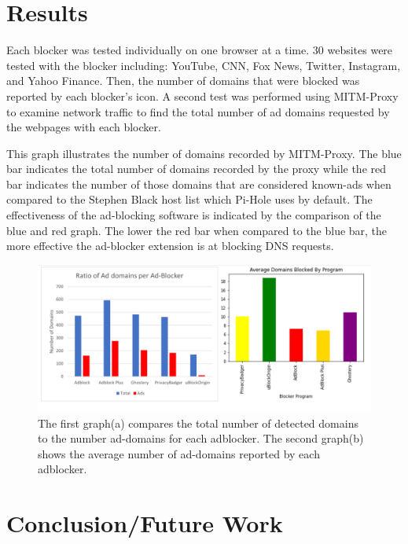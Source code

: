 \documentclass[sigsmall]{acmart}
\begin{document}
\section*{Results}
Each blocker was tested individually on one browser at a time. 30 websites were tested with the blocker including: YouTube, CNN, Fox News, Twitter, Instagram, and Yahoo Finance.
 Then, the number of domains that were blocked was reported by each blocker's icon.
 A second test was performed using MITM-Proxy to examine network traffic to find the total number of ad domains requested by the webpages with each blocker.

This graph illustrates the number of domains recorded by MITM-Proxy.
The blue bar indicates the total number of domains recorded by the proxy while the red bar indicates the number of those domains that are considered known-ads when compared to the Stephen Black host list which Pi-Hole uses by default.
The effectiveness of the ad-blocking software is indicated by the comparison of the blue and red graph. The lower the red bar when compared to the blue bar, the more effective the ad-blocker extension is at blocking DNS requests.

\begin{figure}
  \includegraphics[scale =0.5]{Edit1.png}
  \caption{The first graph(a) compares the total number of detected domains to the number ad-domains for each adblocker. The second graph(b) shows the average number of ad-domains reported by each adblocker.}
  \label{fig:graph1ab}
\end{figure}

\section*{Conclusion/Future Work}




\end{document}
